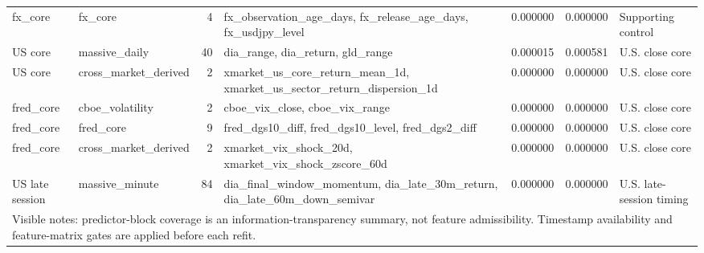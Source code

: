 \begin{tabular}{llrllll}
fx\_core & fx\_core & 4 & fx\_observation\_age\_days, fx\_release\_age\_days, fx\_usdjpy\_level & 0.000000 & 0.000000 & Supporting control \\
US core & massive\_daily & 40 & dia\_range, dia\_return, gld\_range & 0.000015 & 0.000581 & U.S. close core \\
US core & cross\_market\_derived & 2 & xmarket\_us\_core\_return\_mean\_1d, xmarket\_us\_sector\_return\_dispersion\_1d & 0.000000 & 0.000000 & U.S. close core \\
fred\_core & cboe\_volatility & 2 & cboe\_vix\_close, cboe\_vix\_range & 0.000000 & 0.000000 & U.S. close core \\
fred\_core & fred\_core & 9 & fred\_dgs10\_diff, fred\_dgs10\_level, fred\_dgs2\_diff & 0.000000 & 0.000000 & U.S. close core \\
fred\_core & cross\_market\_derived & 2 & xmarket\_vix\_shock\_20d, xmarket\_vix\_shock\_zscore\_60d & 0.000000 & 0.000000 & U.S. close core \\
US late session & massive\_minute & 84 & dia\_final\_window\_momentum, dia\_late\_30m\_return, dia\_late\_60m\_down\_semivar & 0.000000 & 0.000000 & U.S. late-session timing \\
\midrule
\multicolumn{7}{l}{\footnotesize Visible notes: predictor-block coverage is an information-transparency summary, not feature admissibility. Timestamp availability and feature-matrix gates are applied before each refit.} \\
\bottomrule
\end{tabular}
